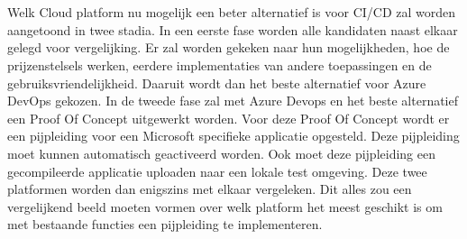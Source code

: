 
\section{}
\label{sec:onderzoeksdoelstelling}
Welk Cloud platform nu mogelijk een beter alternatief is voor CI/CD zal worden aangetoond in twee stadia. In een eerste fase worden alle kandidaten naast elkaar gelegd voor vergelijking. Er zal worden gekeken naar hun mogelijkheden, hoe de prijzenstelsels werken, eerdere implementaties van andere toepassingen en de gebruiksvriendelijkheid. Daaruit wordt dan het beste alternatief voor Azure DevOps gekozen. In de tweede fase zal met Azure Devops en het beste alternatief een Proof Of Concept uitgewerkt worden. Voor deze Proof Of Concept wordt er een pijpleiding voor een Microsoft specifieke applicatie opgesteld. Deze pijpleiding moet kunnen automatisch geactiveerd worden. Ook moet deze pijpleiding een gecompileerde applicatie uploaden naar een lokale test omgeving. Deze twee platformen worden dan enigszins met elkaar vergeleken. Dit alles zou een vergelijkend beeld moeten vormen over welk platform het meest geschikt is om met bestaande functies een pijpleiding te implementeren.


\section{}
\label{sec:opzet-bachelorproef}


